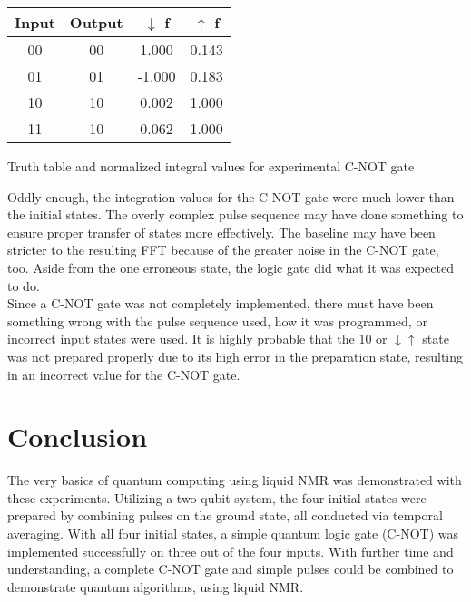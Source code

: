 \documentclass[11pt]{article}
\begin{document}
\begin{multicols}{2}
\begin{ctable}
  \begin{center}
  \begin{tabular}{c|c||c|c}
    Input & Output & $\downarrow$ f & $\uparrow$ f \\
    \hline
    00 & 00 & 1.000 & 0.143 \\
    01 & 01 & -1.000 & 0.183 \\
    10 & 10 & 0.002 & 1.000 \\
    11 & 10 & 0.062 & 1.000 \\
  \end{tabular}
  \end{center}
  \caption{Truth table and normalized integral values for experimental C-NOT gate}
  \label{tab:cnot-int}
\end{ctable}
\vspace{1em}

Oddly enough, the integration values for the C-NOT gate were much lower than the initial states. The overly complex pulse sequence may have done something to ensure proper transfer of states more effectively. The baseline may have been stricter to the resulting FFT because of the greater noise in the C-NOT gate, too. Aside from the one erroneous state, the logic gate did what it was expected to do. \\

Since a C-NOT gate was not completely implemented, there must have been something wrong with the pulse sequence used, how it was programmed, or incorrect input states were used. It is highly probable that the 10 or $\downarrow\uparrow$ state was not prepared properly due to its high error in the preparation state, resulting in an incorrect value for the C-NOT gate.



\section{\textbf{Conclusion}}
The very basics of quantum computing using liquid NMR was demonstrated with these experiments. Utilizing a two-qubit system, the four initial states were prepared by combining pulses on the ground state, all conducted via temporal averaging. With all four initial states, a simple quantum logic gate (C-NOT) was implemented successfully on three out of the four inputs. With further time and understanding, a complete C-NOT gate and simple pulses could be combined to demonstrate quantum algorithms, using liquid NMR.


\raggedright



\end{multicols}
\end{document}
